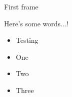\documentclass[xcolor=dvipsnames]{beamer}
\begin{document}
\begin{frame}{First frame}

Here's some words...! 
\begin{itemize}
\item Testing
\item One
\item Two
\item Three
\end{itemize}

\end{frame}
\end{document}
